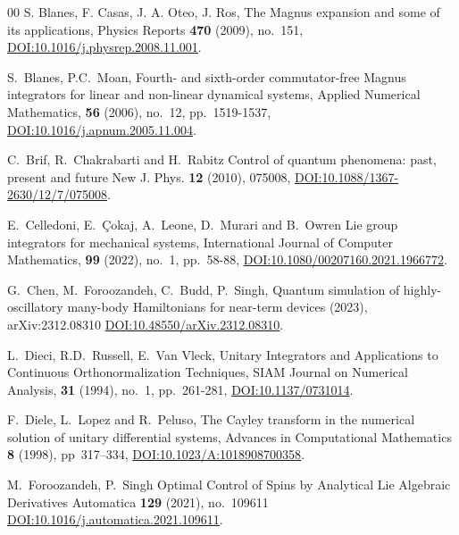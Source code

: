 \documentclass{article}
\begin{document}
\begin{thebibliography}{00}
S. Blanes, F. Casas, J. A. Oteo, J. Ros, 
\newblock The Magnus expansion and some of its applications, 
\newblock Physics Reports \textbf{470} (2009), no.~151, \href{https://doi.org/10.1016/j.physrep.2008.11.001}{DOI:10.1016/j.physrep.2008.11.001}.


S.~Blanes, P.C.~Moan,
\newblock Fourth- and sixth-order commutator-free Magnus integrators for linear and non-linear dynamical systems,
\newblock Applied Numerical Mathematics, \textbf{56} (2006), no.~12, pp.~1519-1537, \href{https://doi.org/10.1016/j.apnum.2005.11.004}{DOI:10.1016/j.apnum.2005.11.004}.


C.~Brif, R.~Chakrabarti and H.~Rabitz 
\newblock Control of quantum phenomena: past, present and future
\newblock New J. Phys. \textbf{12} (2010), 075008, \href{https://doi.org/10.1088/1367-2630/12/7/075008}{DOI:10.1088/1367-2630/12/7/075008}.


E.~Celledoni, E.~Çokaj, A.~Leone, D.~Murari and B.~Owren
\newblock Lie group integrators for mechanical systems, 
\newblock International Journal of Computer Mathematics, \textbf{99} (2022), no.~1, pp.~58-88, \href{https://doi.org/10.1080/00207160.2021.1966772}{DOI:10.1080/00207160.2021.1966772}.


G.~Chen, M.~Foroozandeh, C.~Budd, P.~Singh,
\newblock Quantum simulation of highly-oscillatory many-body Hamiltonians for near-term devices (2023),
\newblock 	arXiv:2312.08310
\href{https://doi.org/10.48550/arXiv.2312.08310}{DOI:10.48550/arXiv.2312.08310}.


L.~Dieci, R.D.~Russell, E.~Van Vleck,
\newblock Unitary Integrators and Applications to Continuous Orthonormalization Techniques,
\newblock SIAM Journal on Numerical Analysis, \textbf{31} (1994), no.~1, pp.~261-281, \href{https://doi.org/10.1137/0731014}{DOI:10.1137/0731014}.


F.~Diele, L.~Lopez and R.~Peluso,
\newblock The Cayley transform in the numerical solution of unitary differential systems,
\newblock Advances in Computational Mathematics \textbf{8} (1998), pp~317–334, \href{https://doi.org/10.1023/A:1018908700358}{DOI:10.1023/A:1018908700358}.


M.~Foroozandeh, P.~Singh
\newblock Optimal Control of Spins by Analytical Lie Algebraic Derivatives
\newblock Automatica \textbf{129} (2021), no.~109611
\href{https://doi.org/10.1016/j.automatica.2021.109611}{DOI:10.1016/j.automatica.2021.109611}.



\end{thebibliography}
\end{document}
